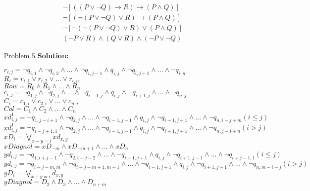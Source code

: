 \normalfont\documentclass[letterpaper,11pt]{article}
\begin{document}
\begin{enumerate}
\begin{align*}
	\neg[((P\lor \neg Q)\to R)\to(P\land Q)]\\
	\neg[(\neg(P\lor \neg Q)\lor R)\to(P\land Q)]\\
	\neg[\neg(\neg(P\lor \neg Q)\lor R)\lor(P\land Q)]\\
	(\neg P\lor R)\land (Q \lor R) \land (\neg P \lor \neg Q)
\end{align*}
\item[Problem 5]\textbf{Solution:}\par
		$r_{i,j} = \neg q_{i,1}\land \neg q_{i,2}\land ... \land \neg q_{i,j-1} \land q_{i,j} \land \neg q_{i,j+1}\land...\land \neg q_{i,n}$\\
		$R_i = r_{i,1} \lor r_{i,2} \lor ... \lor r_{i,n}$\\
		$Row = R_0 \land R_1 \land ... \land R_n$\\

		$c_{i,j} = \neg q_{1,j}\land \neg q_{2,j}\land ... \land \neg q_{i-1,j} \land q_{i,j} \land \neg q_{i+1,j}\land...\land \neg q_{n,j}$\\
		$C_i = c_{1,i} \lor c_{2,i} \lor ... \lor c_{n,i}$\\
		$Col = C_1 \land C_2 \land ... \land C_n$\\

		$xd^1_{i,j} = \neg q_{1,j-i+1}\land \neg q_{2,j}\land ... \land \neg q_{i-1,j-1} \land q_{i,j} \land \neg q_{i+1,j+1}\land...\land \neg q_{n,i-j+m} (i\le j)$\\
		$xd^1_{i,j} = \neg q_{i-j+ 1,1}\land \neg q_{2,j}\land ... \land \neg q_{i-1,j-1} \land q_{i,j} \land \neg q_{i+1,j+1}\land...\land \neg q_{n,j -i + n}(i > j)$\\
		$xD_i = \bigvee  \limits_{x - y = i} xd_{x,y}$\\
		$xDiagnol = xD_{-m} \land xD_{-m+1} \land ... \land xD_n$\\

		$yd_{i,j} = \neg q_{1,i+j-1}\land \neg q_{2,i+j-2}\land ... \land \neg q_{i-1,j+1} \land q_{i,j} \land \neg q_{i+1,j-1}\land...\land \neg q_{i+j-1,1} (i\le j)$\\
		$yd_{i,j} = \neg q_{i+j-m,m}\land \neg q_{i+j-m+1,m - 1}\land ... \land \neg q_{i-1,j+1} \land q_{i,j} \land \neg q_{i+1,j-1}\land...\land \neg q_{n,m - i - j}(i > j)$\\
		$yD_i = \bigvee \limits_{x + y = i} d_{x,y}$\\
		$yDiagnol = D_{2} \land D_{3} \land ... \land D_{n+m}$\\



\end{enumerate}
\end{document}
